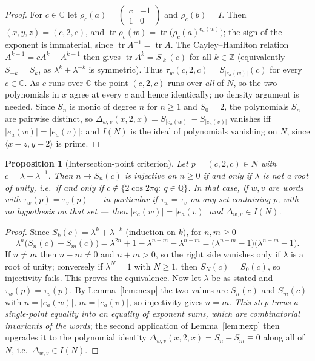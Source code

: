 \documentclass[11pt,a4paper]{article}
\newtheorem{proposition}[theorem]{Proposition}
\theoremstyle{definition}
\theoremstyle{remark}
\newcommand{\tr}{\operatorname{tr}}
\newcommand{\Q}{\mathbb{Q}}
\newcommand{\Z}{\mathbb{Z}}
\begin{document}
\begin{proof}
For $c\in\mathbb{C}$ let $\rho_c(a)=\begin{pmatrix}c&-1\\1&0\end{pmatrix}$
and $\rho_c(b)=I$. Then $(x,y,z)=(c,2,c)$, and
$\tr\rho_c(w)=\tr\bigl(\rho_c(a)^{e_a(w)}\bigr)$; the sign of the exponent
is immaterial, since $\tr A^{-1}=\tr A$. The Cayley--Hamilton relation
$A^{k+1}=cA^k-A^{k-1}$ then gives $\tr A^k=S_{|k|}(c)$ for all
$k\in\Z$ (equivalently $S_{-k}=S_k$, as $\lambda^k+\lambda^{-k}$ is
symmetric). Thus $\tau_w(c,2,c)=S_{|e_a(w)|}(c)$ for every
$c\in\mathbb{C}$. As $c$ runs over $\mathbb{C}$ the point $(c,2,c)$ runs
over \emph{all} of $N$, so the two polynomials in $x$
agree at every $c$ and hence identically; no density argument is needed.
Since $S_n$ is monic of degree $n$ for
$n\ge1$ and $S_0=2$, the polynomials $S_n$ are pairwise distinct, so
$\Delta_{w,v}(x,2,x)=S_{|e_a(w)|}-S_{|e_a(v)|}$ vanishes iff
$|e_a(w)|=|e_a(v)|$; and $I(N)$ is the ideal of polynomials vanishing on
$N$, since $\langle x-z,y-2\rangle$ is prime.
\end{proof}

\begin{proposition}[Intersection-point criterion]
\label{prop:ipc}
Let $p=(c,2,c)\in N$ with $c=\lambda+\lambda^{-1}$. Then
$n\mapsto S_n(c)$ is injective on $n\ge0$ if and only if $\lambda$ is not
a root of unity, i.e.\ if and only if $c\notin\{2\cos 2\pi q:\ q\in\Q\}$.
In that case, if $w,v$ are words with $\tau_w(p)=\tau_v(p)$ --- in
particular if $\tau_w=\tau_v$ on any set containing $p$, with no
hypothesis on that set --- then $|e_a(w)|=|e_a(v)|$ and
$\Delta_{w,v}\in I(N)$.
\end{proposition}

\begin{proof}
Since $S_k(c)=\lambda^k+\lambda^{-k}$ (induction on $k$), for $n,m\ge0$
\begin{equation}
\lambda^{n}\bigl(S_n(c)-S_m(c)\bigr)
=\lambda^{2n}+1-\lambda^{n+m}-\lambda^{n-m}
=\bigl(\lambda^{n-m}-1\bigr)\bigl(\lambda^{n+m}-1\bigr).
\end{equation}
If $n\neq m$ then $n-m\neq0$ and $n+m>0$, so the right side vanishes
only if $\lambda$ is a root of unity; conversely if
$\lambda^N=1$ with $N\ge1$, then $S_{N}(c)=S_0(c)$, so injectivity
fails. This proves the equivalence. Now let $\lambda$ be as stated and
$\tau_w(p)=\tau_v(p)$. By Lemma~\ref{lem:nexp} the two values are
$S_n(c)$ and $S_m(c)$ with $n=|e_a(w)|$, $m=|e_a(v)|$, so injectivity
gives $n=m$. \emph{This step turns a single-point equality into an
equality of exponent sums, which are combinatorial invariants of the
words}; the second application of Lemma~\ref{lem:nexp} then upgrades
it to the polynomial identity $\Delta_{w,v}(x,2,x)=S_n-S_m\equiv0$ along
all of $N$, i.e.\ $\Delta_{w,v}\in I(N)$.
\end{proof}
\end{document}
